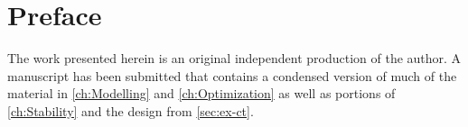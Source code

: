 
\chapter{Preface}

The work presented herein is an original independent production of the author. A manuscript has been submitted that contains a condensed version of much of the material in \autoref{ch:Modelling} and \autoref{ch:Optimization} as well as portions of \autoref{ch:Stability} and the  design from \autoref{sec:ex-ct}.
